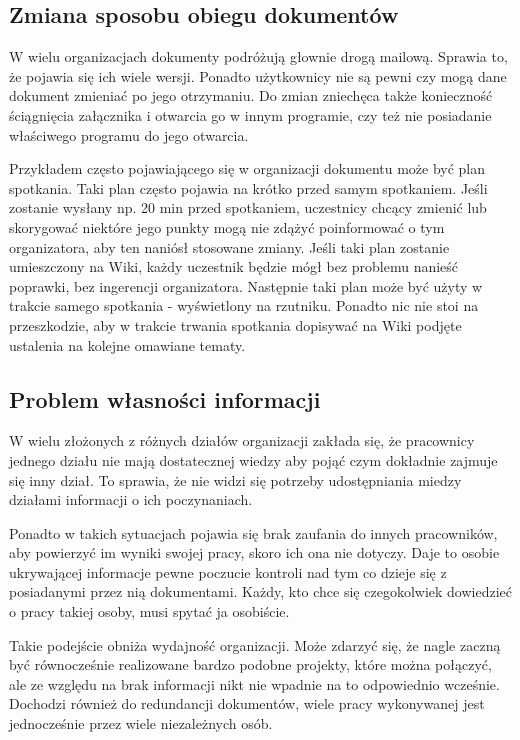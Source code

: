 \documentclass{article}
\begin{document}
		

		


	\subsection{Zmiana sposobu obiegu dokumentów}


	W wielu organizacjach dokumenty podróżują głownie drogą mailową. Sprawia to, że pojawia się ich wiele wersji. Ponadto użytkownicy nie są pewni czy mogą dane dokument zmieniać po jego otrzymaniu. Do zmian zniechęca także konieczność ściągnięcia załącznika i  otwarcia go w innym programie, czy też nie posiadanie właściwego programu do jego otwarcia.

	Przykładem często pojawiającego się w organizacji dokumentu może być plan spotkania. Taki plan często pojawia na krótko przed samym spotkaniem. Jeśli zostanie wysłany np. 20 min przed spotkaniem, uczestnicy chcący zmienić lub skorygować niektóre jego punkty mogą nie zdążyć poinformować o tym organizatora, aby ten naniósł stosowane zmiany. Jeśli taki plan zostanie umieszczony na Wiki, każdy uczestnik będzie mógł bez problemu nanieść poprawki, bez ingerencji organizatora. Następnie taki plan może być użyty w trakcie samego spotkania - wyświetlony na rzutniku. Ponadto nic nie stoi na przeszkodzie, aby w trakcie trwania spotkania dopisywać na Wiki podjęte ustalenia na kolejne omawiane tematy.   
	
	\subsection{Problem własności informacji}

	W wielu złożonych z różnych działów organizacji zakłada się, że pracownicy jednego działu nie mają dostatecznej wiedzy aby pojąć czym dokładnie zajmuje się inny dział. To sprawia, że nie widzi się potrzeby udostępniania miedzy działami informacji o ich poczynaniach. 

	Ponadto w takich sytuacjach pojawia się brak zaufania do innych pracowników, aby powierzyć im wyniki swojej pracy, skoro ich ona nie dotyczy. Daje to osobie ukrywającej informacje pewne poczucie kontroli nad tym co dzieje się z posiadanymi przez nią dokumentami. Każdy, kto chce się czegokolwiek dowiedzieć o pracy takiej osoby, musi spytać ja osobiście. 

	Takie podejście obniża wydajność organizacji. Może zdarzyć się, że nagle zaczną być równocześnie realizowane bardzo podobne projekty, które można połączyć, ale ze względu na brak informacji nikt nie wpadnie na to odpowiednio wcześnie. Dochodzi również do redundancji dokumentów, wiele pracy wykonywanej jest jednocześnie przez wiele niezależnych osób.
\end{document}
